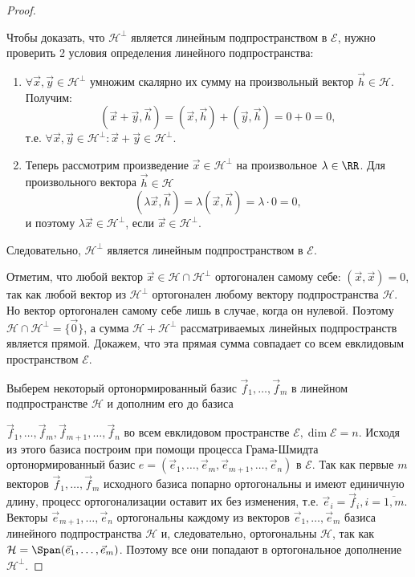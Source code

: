 \begin{proof}~

    Чтобы доказать, что $\mathcal{H}^\perp$ является линейным подпространством в $\mathcal{E}$, нужно проверить 2 условия определения линейного подпространства:
    \begin{enumerate}
        \item $\forall \vec{x}, \vec{y} \in \mathcal{H}^\perp$ умножим скалярно их сумму на произвольный вектор $\vec{h} \in \mathcal{H}$. Получим:
        $$(\vec{x} + \vec{y}, \vec{h}) = (\vec{x}, \vec{h}) + (\vec{y}, \vec{h}) = 0 + 0 = 0,$$
        т.е. $\forall \vec{x}, \vec{y} \in \mathcal{H}^\perp \colon \vec{x} + \vec{y} \in \mathcal{H}^\perp$. 
        \item Теперь рассмотрим произведение $\vec{x} \in \mathcal{H}^\perp$ на произвольное $\lambda \in \RR$. Для произвольного вектора $\vec{h} \in \mathcal{H}$
        $$(\lambda \vec{x}, \vec{h}) = \lambda(\vec{x}, \vec{h}) = \lambda \cdot 0 = 0,$$
        и поэтому $\lambda \vec{x} \in \mathcal{H}^\perp$, если $\vec{x} \in \mathcal{H}^\perp$.
    \end{enumerate}
    Следовательно, $\mathcal{H}^\perp$ является линейным подпространством в $\mathcal{E}$.

    Отметим, что любой вектор $\vec{x} \in \mathcal{H} \cap \mathcal{H}^\perp$ ортогонален самому себе: $(\vec{x}, \vec{x}) = 0$, так как любой вектор из $\mathcal{H}^\perp$ ортогонален любому вектору подпространства $\mathcal{H}$. Но вектор ортогонален самому себе лишь в случае, когда он нулевой. Поэтому $\mathcal{H} \cap \mathcal{H}^\perp = \{\vec{0}\}$, а сумма $\mathcal{H} + \mathcal{H}^\perp$ рассматриваемых линейных подпространств является прямой. Докажем, что эта прямая сумма совпадает со всем евклидовым пространством $\mathcal{E}$.

    Выберем некоторый ортонормированный базис $\vec{f}_1, \ldots, \vec{f}_m$ в линейном подпространстве $\mathcal{H}$ и дополним его до базиса 
    
    $\vec{f}_1, \ldots, \vec{f}_m, \vec{f}_{m + 1}, \ldots, \vec{f}_n$ во всем евклидовом пространстве $\mathcal{E}, \dim \mathcal{E} = n$. Исходя из этого базиса построим при помощи процесса Грама-Шмидта ортонормированный базис $e = (\vec{e}_1, \ldots, \vec{e}_m, \vec{e}_{m + 1}, \ldots, \vec{e}_n)$ в $\mathcal{E}$. Так как первые $m$ векторов $\vec{f}_1, \ldots, \vec{f}_m$ исходного базиса попарно ортогональны и имеют единичную длину, процесс ортогонализации оставит их без изменения, т.е. $\vec{e}_i = \vec{f}_i, i = \overline{1, m}$. Векторы $\vec{e}_{m + 1}, \ldots, \vec{e}_n$ ортогональны каждому из векторов $\vec{e}_1, \ldots, \vec{e}_m$ базиса линейного подпространства $\mathcal{H}$ и, следовательно, ортогональны $\mathcal{H}$, так как $\mathcal{H} = \Span(\vec{e}_1, \ldots, \vec{e}_m)$. Поэтому все они попадают в ортогональное дополнение $\mathcal{H}^\perp$.


\end{proof}
